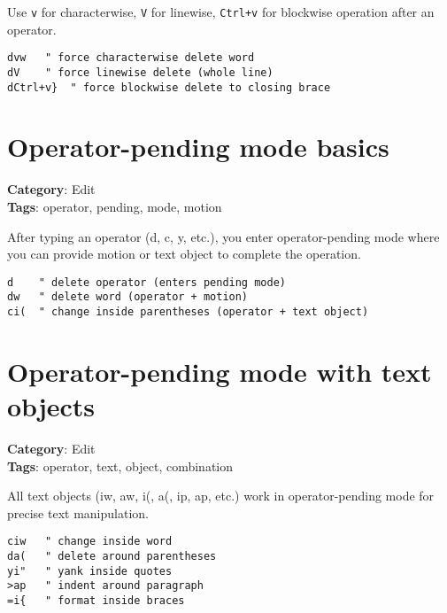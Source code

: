 {{{Use {\footnotesize \Verb§v§} for characterwise, {\footnotesize \Verb§V§} for linewise, {\footnotesize \Verb§Ctrl+v§} for blockwise operation after an operator.

\begin{Exa*}{}
\begin{Verbatim}[fontsize=\footnotesize, breaklines, breakanywhere]
dvw   " force characterwise delete word
dV    " force linewise delete (whole line)
dCtrl+v}  " force blockwise delete to closing brace
\end{Verbatim}
\end{Exa*}

\section{Operator-pending mode basics}

\textbf{Category}: Edit\\ \textbf{Tags}: operator, pending, mode, motion
\vspace{0.5cm}

After typing an operator (d, c, y, etc.), you enter operator-pending mode where you can provide motion or text object to complete the operation.

\begin{Exa*}{}
\begin{Verbatim}[fontsize=\footnotesize, breaklines, breakanywhere]
d    " delete operator (enters pending mode)
dw   " delete word (operator + motion)
ci(  " change inside parentheses (operator + text object)
\end{Verbatim}
\end{Exa*}

\section{Operator-pending mode with text objects}

\textbf{Category}: Edit\\ \textbf{Tags}: operator, text, object, combination
\vspace{0.5cm}

All text objects (iw, aw, i(, a(, ip, ap, etc.) work in operator-pending mode for precise text manipulation.

\begin{Exa*}{}
\begin{Verbatim}[fontsize=\footnotesize, breaklines, breakanywhere]
ciw   " change inside word
da(   " delete around parentheses
yi"   " yank inside quotes
>ap   " indent around paragraph
=i{   " format inside braces
\end{Verbatim}
\end{Exa*}

}}}
